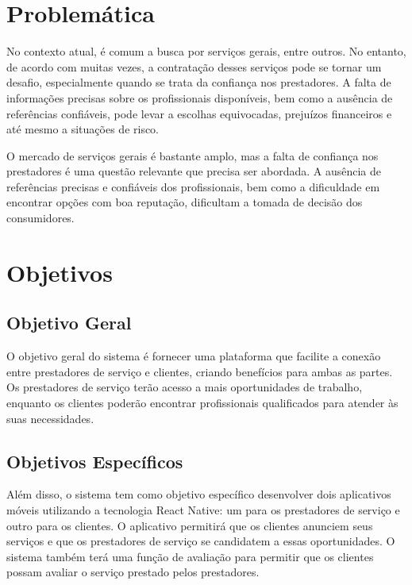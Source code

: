 \section{Problemática}

No contexto atual, é comum a busca por serviços gerais, entre outros. No entanto, de acordo com \textcite{FEUP2009} muitas vezes, a contratação desses serviços pode se tornar um desafio, especialmente quando se trata da confiança nos prestadores. A falta de informações precisas sobre os profissionais disponíveis, bem como a ausência de referências confiáveis, pode levar a escolhas equivocadas, prejuízos financeiros e até mesmo a situações de risco.

O mercado de serviços gerais é bastante amplo, mas a falta de confiança nos prestadores é uma questão relevante que precisa ser abordada. A ausência de referências precisas e confiáveis dos profissionais, bem como a dificuldade em encontrar opções com boa reputação, dificultam a tomada de decisão dos consumidores.

\section{Objetivos}



\subsection{Objetivo Geral}
O objetivo geral do sistema é fornecer uma plataforma que facilite a conexão entre prestadores de serviço e clientes, 
criando benefícios para ambas as partes. Os prestadores de serviço terão acesso a mais oportunidades de trabalho, 
enquanto os clientes poderão encontrar profissionais qualificados para atender às suas necessidades.

\subsection{Objetivos Específicos}

Além disso, o sistema tem como objetivo específico desenvolver dois aplicativos móveis utilizando a tecnologia React Native: um para os prestadores de serviço e outro para os clientes. O aplicativo permitirá que os clientes anunciem seus serviços e que os prestadores de serviço se candidatem a essas oportunidades. O sistema também terá uma função de avaliação para permitir que os clientes possam avaliar o serviço prestado pelos prestadores.

